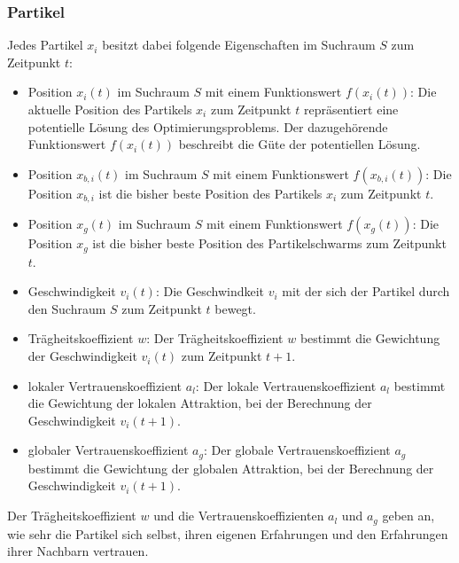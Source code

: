 \documentclass[a4paper, 11pt]{article}
\begin{document}
\subsubsection{Partikel}
Jedes Partikel $x_{i}$ besitzt dabei folgende Eigenschaften im Suchraum $S$ zum Zeitpunkt $t$:
\begin{itemize}
	\item Position $x_{i}(t)$ im Suchraum $S$ mit einem Funktionswert $f(x_{i}(t))$: Die aktuelle Position des Partikels $x_{i}$ zum Zeitpunkt $t$ repräsentiert eine potentielle Lösung des Optimierungsproblems. Der dazugehörende Funktionswert $f(x_{i}(t))$ beschreibt die Güte der potentiellen Lösung.
	\item Position $x_{b,i}(t)$ im Suchraum $S$ mit einem Funktionswert $f(x_{b,i}(t))$: Die Position $x_{b,i}$ ist die bisher beste Position des Partikels $x_{i}$ zum Zeitpunkt $t$.
	\item Position $x_{g}(t)$ im Suchraum $S$ mit einem Funktionswert $f(x_{g}(t))$: Die Position $x_{g}$ ist die bisher beste Position des Partikelschwarms zum Zeitpunkt $t$.
	\item Geschwindigkeit $v_{i}(t)$: Die Geschwindkeit $v_{i}$ mit der sich der Partikel durch den Suchraum $S$ zum Zeitpunkt $t$ bewegt.
	\item Trägheitskoeffizient $w$: Der Trägheitskoeffizient $w$ bestimmt die Gewichtung der Geschwindigkeit $v_{i}(t)$ zum Zeitpunkt $t+1$.
	\item lokaler Vertrauenskoeffizient $a_{l}$: Der lokale Vertrauenskoeffizient $a_{l}$ bestimmt die Gewichtung der lokalen Attraktion, bei der Berechnung der Geschwindigkeit $v_{i}(t+1)$.
	\item globaler Vertrauenskoeffizient $a_{g}$: Der globale Vertrauenskoeffizient $a_{g}$ bestimmt die Gewichtung der globalen Attraktion, bei der Berechnung der Geschwindigkeit $v_{i}(t+1)$.
\end{itemize}
Der Trägheitskoeffizient $w$ und die Vertrauenskoeffizienten $a_{l}$ und $a_{g}$ geben an, wie sehr die Partikel sich selbst, ihren eigenen Erfahrungen und den Erfahrungen ihrer Nachbarn vertrauen.
\newpage
\end{document}
